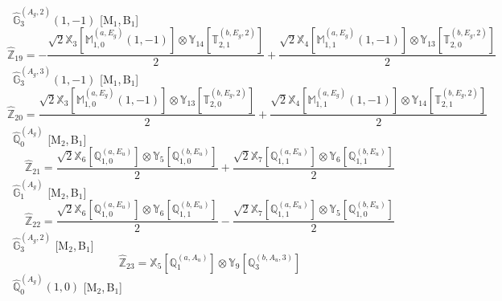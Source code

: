 \documentclass[fleqn,10pt,landscape]{article}
\begin{document}
\begin{itemize}
\begin{dmath*}
\end{dmath*}
\vspace{4mm}
\noindent {} $\,\,\,\hat{\mathbb{G}}_{3}^{(A_{g},2)}(1,-1)$ [M$_{1}$,\,B$_{1}$]
\begin{dmath*}
\hat{\mathbb{Z}}_{19}=- \frac{\sqrt{2} \mathbb{X}_{3}[\mathbb{M}_{1,0}^{(a,E_{g})}(1,-1)] \otimes\mathbb{Y}_{14}[\mathbb{T}_{2,1}^{(b,E_{g},2)}]}{2} + \frac{\sqrt{2} \mathbb{X}_{4}[\mathbb{M}_{1,1}^{(a,E_{g})}(1,-1)] \otimes\mathbb{Y}_{13}[\mathbb{T}_{2,0}^{(b,E_{g},2)}]}{2}
\end{dmath*}
\vspace{4mm}
\noindent {} $\,\,\,\hat{\mathbb{G}}_{3}^{(A_{g},3)}(1,-1)$ [M$_{1}$,\,B$_{1}$]
\begin{dmath*}
\hat{\mathbb{Z}}_{20}=\frac{\sqrt{2} \mathbb{X}_{3}[\mathbb{M}_{1,0}^{(a,E_{g})}(1,-1)] \otimes\mathbb{Y}_{13}[\mathbb{T}_{2,0}^{(b,E_{g},2)}]}{2} + \frac{\sqrt{2} \mathbb{X}_{4}[\mathbb{M}_{1,1}^{(a,E_{g})}(1,-1)] \otimes\mathbb{Y}_{14}[\mathbb{T}_{2,1}^{(b,E_{g},2)}]}{2}
\end{dmath*}
\vspace{4mm}
\noindent {} $\,\,\,\hat{\mathbb{Q}}_{0}^{(A_{g})}$ [M$_{2}$,\,B$_{1}$]
\begin{dmath*}
\hat{\mathbb{Z}}_{21}=\frac{\sqrt{2} \mathbb{X}_{6}[\mathbb{Q}_{1,0}^{(a,E_{u})}] \otimes\mathbb{Y}_{5}[\mathbb{Q}_{1,0}^{(b,E_{u})}]}{2} + \frac{\sqrt{2} \mathbb{X}_{7}[\mathbb{Q}_{1,1}^{(a,E_{u})}] \otimes\mathbb{Y}_{6}[\mathbb{Q}_{1,1}^{(b,E_{u})}]}{2}
\end{dmath*}
\vspace{4mm}
\noindent {} $\,\,\,\hat{\mathbb{G}}_{1}^{(A_{g})}$ [M$_{2}$,\,B$_{1}$]
\begin{dmath*}
\hat{\mathbb{Z}}_{22}=\frac{\sqrt{2} \mathbb{X}_{6}[\mathbb{Q}_{1,0}^{(a,E_{u})}] \otimes\mathbb{Y}_{6}[\mathbb{Q}_{1,1}^{(b,E_{u})}]}{2} - \frac{\sqrt{2} \mathbb{X}_{7}[\mathbb{Q}_{1,1}^{(a,E_{u})}] \otimes\mathbb{Y}_{5}[\mathbb{Q}_{1,0}^{(b,E_{u})}]}{2}
\end{dmath*}
\vspace{4mm}
\noindent {} $\,\,\,\hat{\mathbb{G}}_{3}^{(A_{g},2)}$ [M$_{2}$,\,B$_{1}$]
\begin{dmath*}
\hat{\mathbb{Z}}_{23}=\mathbb{X}_{5}[\mathbb{Q}_{1}^{(a,A_{u})}] \otimes\mathbb{Y}_{9}[\mathbb{Q}_{3}^{(b,A_{u},3)}]
\end{dmath*}
\vspace{4mm}
\noindent {} $\,\,\,\hat{\mathbb{Q}}_{0}^{(A_{g})}(1,0)$ [M$_{2}$,\,B$_{1}$]

\end{itemize}
\end{document}
